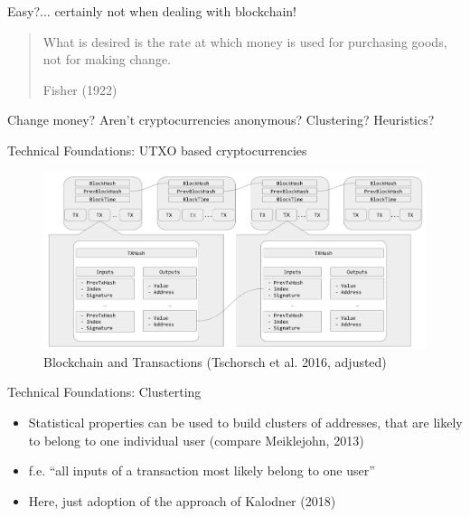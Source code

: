 \documentclass[]{beamer}
\begin{document}
\begin{frame}{ Easy?... certainly not when dealing with blockchain!}

  \vfill


  \vfill

  \blockquote[Fisher (1922)]{What is desired is the rate at which money is used for purchasing goods, not for making change.} %

  \vfill

  Change money? Aren't cryptocurrencies anonymous? Clustering? Heuristics? 

  \vfill
  
\end{frame}


\begin{frame}{Technical Foundations: UTXO based cryptocurrencies}

  \begin{figure}
    \centerline{\includegraphics[scale=0.2]{./pics/used/utxo_sys_HR}}
    \caption{Blockchain and Transactions (Tschorsch et al. 2016, adjusted)}
    \label{fig:utxo_sys}
  \end{figure}

  
\end{frame}


\begin{frame}{Technical Foundations: Clusterting}

  \begin{itemize}
  \item Statistical properties can be used to build clusters of addresses, %
    that are likely to belong to one individual user %
    (compare Meiklejohn, 2013)
  \item f.e. ``all inputs of a transaction most likely belong to one user''
  \item Here, just adoption of the approach of Kalodner (2018) 
  \end{itemize}
  
\end{frame}
\end{document}
